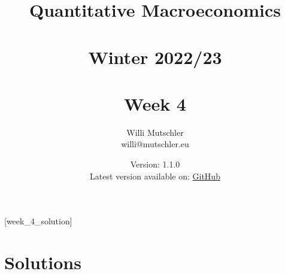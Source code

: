 
\newif\ifDisplaySolutions\DisplaySolutionstrue


\title{Quantitative Macroeconomics\\~\\Winter 2022/23\\~\\Week 4}
\author{Willi Mutschler\\willi@mutschler.eu}
\date{Version: 1.1.0\\Latest version available on: \href{https://github.com/wmutschl/Quantitative-Macroeconomics/releases/latest/download/week_4.pdf}{GitHub}}
\maketitle\thispagestyle{empty}

\newpage
{}[week_4_solution]
\tableofcontents\thispagestyle{empty}\newpage

\setcounter{page}{1}
\newpage
\newpage
\newpage
\printbibliography
\newpage

\ifDisplaySolutions
\newpage
\appendix
\section{Solutions}

\fi
